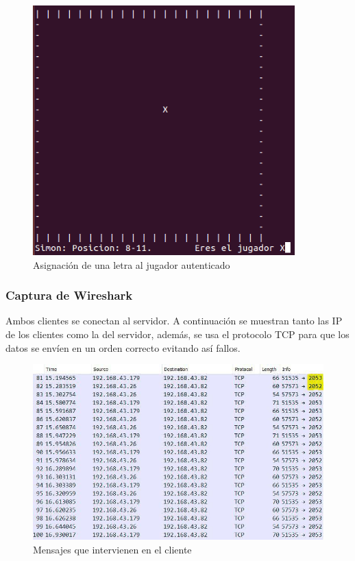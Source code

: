 \begin{figure}[h]
	\centering
	\includegraphics[width=.3\textwidth]{img/5}
	\caption{Asignación de una letra al jugador autenticado}
\end{figure}

	


\newpage
\subsubsection{Captura de Wireshark}

Ambos clientes se conectan al servidor. A continuación se muestran tanto las IP de
los clientes como la del servidor, además, se usa el protocolo TCP para que los datos se envíen 
en un orden correcto evitando así fallos.

\begin{figure}[h]
	\centering
	\includegraphics[width=.8\textwidth]{img/7}
	\caption{Mensajes que intervienen en el cliente}
\end{figure}




